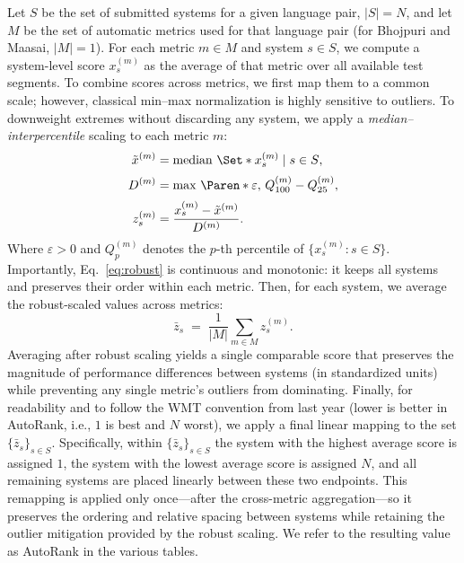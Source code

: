 \documentclass[11pt]{article}
\DeclareMathOperator*{\median}{median}
\newcommand{\Q}[2]{Q^{(#1)}_{#2}} %
\DeclarePairedDelimiter\Set\{\}{}
\DeclarePairedDelimiter\Paren()   %
\begin{document}
Let $S$ be the set of submitted systems for a given language pair, $|S|=N$, and let $M$ be the set of automatic metrics used for that language pair (for Bhojpuri and Maasai, $|M|=1$). For each metric $m\in M$ and system $s\in S$, we compute a system-level score $x^{(m)}_s$ as the average of that metric over all available test segments. To combine scores across metrics, we first map them to a common scale; however, classical min–max normalization is highly sensitive to outliers. To downweight extremes without discarding any system, we apply a \emph{median--inter\-percentile} scaling to each metric $m$:
\begin{subequations}\label{eq:robust}
\begin{align}
\tilde{x}^{(m)} &= \median\,\Set*{x^{(m)}_s \mid s \in S},\\[2pt]
D^{(m)} &= \max\,\Paren*{\varepsilon,\, \Q{m}{100} - \Q{m}{25}},\\[2pt]
z^{(m)}_s &= \frac{x^{(m)}_s - \tilde{x}^{(m)}}{D^{(m)}}.
\end{align}
\end{subequations}
Where $\varepsilon>0$ and $\Q{m}{p}$ denotes the $p$-th percentile of $\{x^{(m)}_s : s\in S\}$. Importantly, Eq.~\eqref{eq:robust} is continuous and monotonic: it keeps all systems and preserves their order within each metric. Then, for each system, we average the robust-scaled values across metrics:
\begin{equation}
    \bar{z}_s \;=\; \frac{1}{|M|}\sum_{m\in M} z^{(m)}_s .
    \label{eq:avgz}
\end{equation}
Averaging after robust scaling yields a single comparable score that preserves the magnitude of performance differences between systems (in standardized units) while preventing any single metric’s outliers from dominating. Finally, for readability and to follow the WMT convention from last year (lower is better in AutoRank, i.e., $1$ is best and $N$ worst), we apply a final linear mapping to the set $\{\bar{z}_s\}_{s\in S}$. Specifically, within $\{\bar{z}_s\}_{s\in S}$ the system with the highest average score is assigned $1$, the system with the lowest average score is assigned $N$, and all remaining systems are placed linearly between these two endpoints. This remapping is applied only once—after the cross-metric aggregation—so it preserves the ordering and relative spacing between systems while retaining the outlier mitigation provided by the robust scaling. We refer to the resulting value as AutoRank in the various tables.
\end{document}
